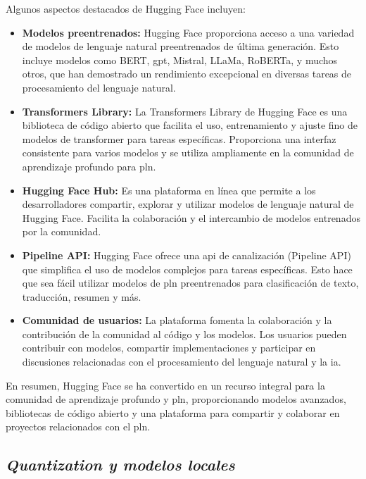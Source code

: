 Algunos aspectos destacados de Hugging Face incluyen\cite{HuggingFace}:
\begin{itemize}

\item \textbf{Modelos preentrenados:} Hugging Face proporciona acceso a una variedad de modelos de lenguaje natural preentrenados de última generación. Esto incluye modelos como BERT, \acrshort{gpt}, Mistral, LLaMa, RoBERTa, y muchos otros, que han demostrado un rendimiento excepcional en diversas tareas de procesamiento del lenguaje natural.

\item \textbf{Transformers Library:} La Transformers Library de Hugging Face es una biblioteca de código abierto que facilita el uso, entrenamiento y ajuste fino de modelos de transformer para tareas específicas. Proporciona una interfaz consistente para varios modelos y se utiliza ampliamente en la comunidad de aprendizaje profundo para \acrshort{pln}.

\item \textbf{Hugging Face Hub:} Es una plataforma en línea que permite a los desarrolladores compartir, explorar y utilizar modelos de lenguaje natural de Hugging Face. Facilita la colaboración y el intercambio de modelos entrenados por la comunidad.

\item \textbf{Pipeline API:} Hugging Face ofrece una \acrshort{api} de canalización (Pipeline API) que simplifica el uso de modelos complejos para tareas específicas. Esto hace que sea fácil utilizar modelos de \acrshort{pln} preentrenados para clasificación de texto, traducción, resumen y más.

\item \textbf{Comunidad de usuarios:} La plataforma fomenta la colaboración y la contribución de la comunidad al código y los modelos. Los usuarios pueden contribuir con modelos, compartir implementaciones y participar en discusiones relacionadas con el procesamiento del lenguaje natural y la \acrlong{ia}.
\end{itemize}

En resumen, Hugging Face se ha convertido en un recurso integral para la comunidad de aprendizaje profundo y \acrshort{pln}, proporcionando modelos avanzados, bibliotecas de código abierto y una plataforma para compartir y colaborar en proyectos relacionados con el \acrlong{pln}.



\subsection{\textit{Quantization y modelos locales}}

